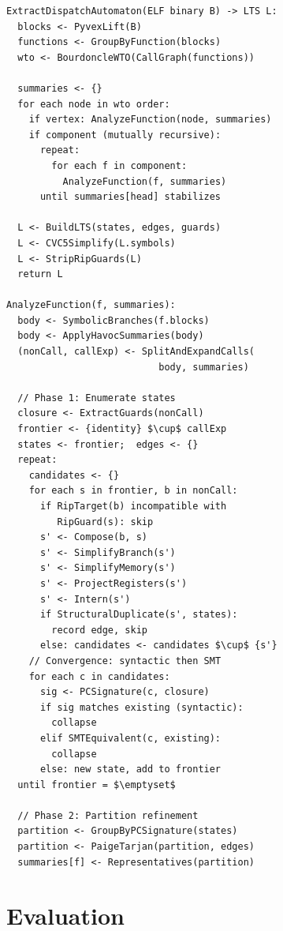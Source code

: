 \documentclass[conference]{./template/IEEEtran}
\begin{document}
\begin{small}
\begin{lstlisting}[mathescape=true,basicstyle=\ttfamily\scriptsize,frame=none]
ExtractDispatchAutomaton(ELF binary B) -> LTS L:
  blocks <- PyvexLift(B)
  functions <- GroupByFunction(blocks)
  wto <- BourdoncleWTO(CallGraph(functions))

  summaries <- {}
  for each node in wto order:
    if vertex: AnalyzeFunction(node, summaries)
    if component (mutually recursive):
      repeat:
        for each f in component:
          AnalyzeFunction(f, summaries)
      until summaries[head] stabilizes

  L <- BuildLTS(states, edges, guards)
  L <- CVC5Simplify(L.symbols)
  L <- StripRipGuards(L)
  return L

AnalyzeFunction(f, summaries):
  body <- SymbolicBranches(f.blocks)
  body <- ApplyHavocSummaries(body)
  (nonCall, callExp) <- SplitAndExpandCalls(
                           body, summaries)

  // Phase 1: Enumerate states
  closure <- ExtractGuards(nonCall)
  frontier <- {identity} $\cup$ callExp
  states <- frontier;  edges <- {}
  repeat:
    candidates <- {}
    for each s in frontier, b in nonCall:
      if RipTarget(b) incompatible with
         RipGuard(s): skip
      s' <- Compose(b, s)
      s' <- SimplifyBranch(s')
      s' <- SimplifyMemory(s')
      s' <- ProjectRegisters(s')
      s' <- Intern(s')
      if StructuralDuplicate(s', states):
        record edge, skip
      else: candidates <- candidates $\cup$ {s'}
    // Convergence: syntactic then SMT
    for each c in candidates:
      sig <- PCSignature(c, closure)
      if sig matches existing (syntactic):
        collapse
      elif SMTEquivalent(c, existing):
        collapse
      else: new state, add to frontier
  until frontier = $\emptyset$

  // Phase 2: Partition refinement
  partition <- GroupByPCSignature(states)
  partition <- PaigeTarjan(partition, edges)
  summaries[f] <- Representatives(partition)
\end{lstlisting}
\end{small}

\section{Evaluation}
\end{document}
